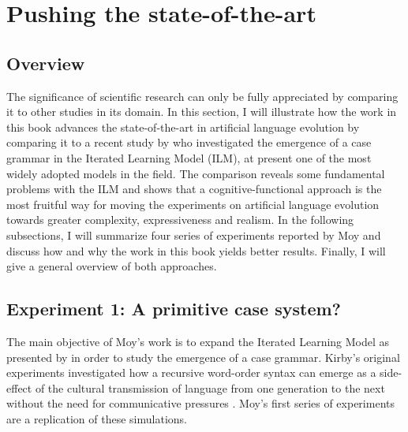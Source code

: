 \newpage
\section{Pushing the state-of-the-art}
\label{s:impact}

\subsection{Overview}

The significance of scientific research can only be fully appreciated by comparing it to other studies in its domain. In this section, I will illustrate how the work in this book advances the state-of-the-art in artificial language evolution by comparing it to a recent study by \citet{moy06case} who investigated the emergence of a case grammar in the Iterated Learning Model (ILM), at present one of the most widely adopted models in the field. The comparison reveals some fundamental problems with the ILM and shows that a cognitive-functional approach is the most fruitful way for moving the experiments on artificial language evolution towards greater complexity, expressiveness and realism. In the following subsections, I will summarize four series of experiments reported by Moy and discuss how and why the work in this book yields better results. Finally, I will give a general overview of both approaches.

\subsection{Experiment 1: A primitive case system?}

The main objective of Moy's work is to expand the Iterated Learning Model as presented by \citet{kirby02learning} in order to study the emergence of a case grammar. Kirby's original experiments investigated how a recursive word-order syntax can emerge as a side-effect of the cultural transmission of language from one generation to the next without the need for communicative pressures \citep[the so-called ``function independence principle'', ][]{brighton05cultural}. Moy's first series of experiments are a replication of these simulations.
 
